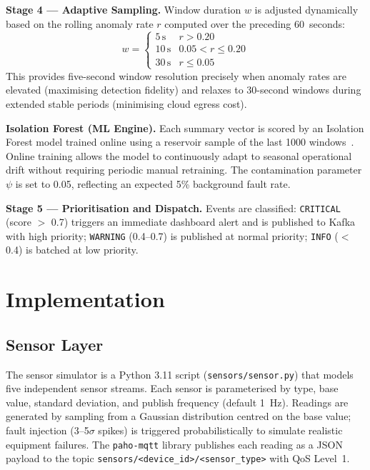 \documentclass[conference]{IEEEtran}
\begin{document}
\textbf{Stage 4 --- Adaptive Sampling.}
Window duration $w$ is adjusted dynamically based on the rolling anomaly
rate $r$ computed over the preceding 60~seconds:
\begin{equation}
  w = \begin{cases}
    5\,\text{s}  & r > 0.20 \\
    10\,\text{s} & 0.05 < r \leq 0.20 \\
    30\,\text{s} & r \leq 0.05
  \end{cases}
  \label{eq:adaptive}
\end{equation}
This provides five-second window resolution precisely when anomaly rates
are elevated (maximising detection fidelity) and relaxes to 30-second
windows during extended stable periods (minimising cloud egress cost).

\textbf{Isolation Forest (ML Engine).}
Each summary vector is scored by an Isolation Forest model trained online
using a reservoir sample of the last 1000 windows~\cite{b7}. Online training
allows the model to continuously adapt to seasonal operational drift without
requiring periodic manual retraining. The contamination parameter $\psi$
is set to 0.05, reflecting an expected 5\% background fault rate.

\textbf{Stage 5 --- Prioritisation and Dispatch.}
Events are classified: \texttt{CRITICAL} (score $>$ 0.7) triggers an
immediate dashboard alert and is published to Kafka with high priority;
\texttt{WARNING} (0.4--0.7) is published at normal priority; \texttt{INFO}
($<$ 0.4) is batched at low priority.

\section{Implementation}
\label{sec:impl}

\subsection{Sensor Layer}

The sensor simulator is a Python 3.11 script (\texttt{sensors/sensor.py})
that models five independent sensor streams. Each sensor is parameterised
by type, base value, standard deviation, and publish frequency (default
1~Hz). Readings are generated by sampling from a Gaussian distribution
centred on the base value; fault injection (3--5$\sigma$ spikes) is
triggered probabilistically to simulate realistic equipment failures. The
\texttt{paho-mqtt} library publishes each reading as a JSON payload to the
topic \texttt{sensors/<device\_id>/<sensor\_type>} with QoS Level~1.
\end{document}
